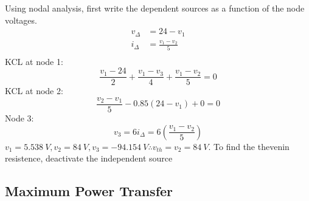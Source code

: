 \documentclass{article}
\begin{document}
\begin{sol}
    Using nodal analysis, first write the dependent sources as a function of the node voltages.
    \begin{align}
        v_\Delta&=24-v_1\\
        i_\Delta&=\frac{v_1-v_2}{5}\\
    \end{align}
    KCL at node 1:
    \begin{equation}
        \frac{v_1-24}{2}+\frac{v_1-v_3}{4}+\frac{v_1-v_2}{5}=0
    \end{equation}
    KCL at node 2:
    \begin{equation}
        \frac{v_2-v_1}{5}-0.85(24-v_1)+0=0
    \end{equation}
    Node 3:
    \begin{equation}
        v_3=6i_\Delta=6\left(\frac{v_1-v_2}{5}\right)
    \end{equation}
    $v_1=\SI{5.538}{V},v_2=\SI{84}{V},v_3=\SI{-94.154}{V}\therefore v_{th}=v_2=\SI{84}{V}$.
    To find the thevenin resistence, deactivate the independent source
\end{sol}
\subsection{Maximum Power Transfer}
\end{document}
